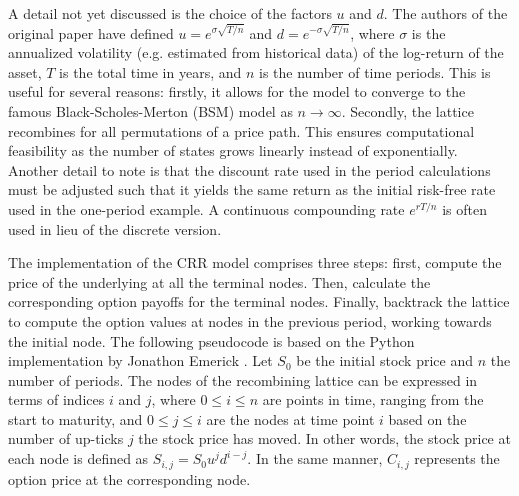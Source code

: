 \documentclass[english,12pt,a4paper,pdftex,sci,utf8]{aaltothesis}
\begin{document}
A detail not yet discussed is the choice of the factors $u$ and $d$. The authors of the original paper have defined $u = e^{\sigma\sqrt{T/n}}$ and $d = e^{-\sigma\sqrt{T/n}}$, where $\sigma$ is the annualized volatility (e.g. estimated from historical data) of the log-return of the asset, $T$ is the total time in years, and $n$ is the number of time periods. This is useful for several reasons: firstly, it allows for the model to converge to the famous Black-Scholes-Merton (BSM) model as $n \rightarrow \infty$. Secondly, the lattice recombines for all permutations of a price path. This ensures computational feasibility as the number of states grows linearly instead of exponentially. Another detail to note is that the discount rate used in the period calculations must be adjusted such that it yields the same return as the initial risk-free rate used in the one-period example. A continuous compounding rate $e^{rT/n}$ is often used in lieu of the discrete version. \cite{cox1979option} \cite{hull2013fundamentals}

The implementation of the CRR model comprises three steps: first, compute the price of the underlying at all the terminal nodes. Then, calculate the corresponding option payoffs for the terminal nodes. Finally, backtrack the lattice to compute the option values at nodes in the previous period, working towards the initial node. The following pseudocode is based on the Python implementation by Jonathon Emerick \cite{thequantpy2024github}. Let $S_0$ be the initial stock price and $n$ the number of periods. The nodes of the recombining lattice can be expressed in terms of indices $i$ and $j$, where $0 \leq i \leq n$ are points in time, ranging from the start to maturity, and $0 \le j \le i$ are the nodes at time point $i$ based on the number of up-ticks $j$ the stock price has moved. In other words, the stock price at each node is defined as $S_{i,j} = S_0u^jd^{i-j}$. In the same manner, $C_{i,j}$ represents the option price at the corresponding node.
\end{document}
